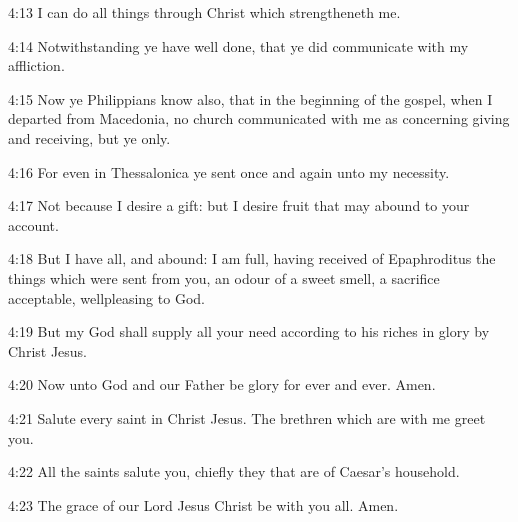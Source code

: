 4:13 I can do all things through Christ which strengtheneth me.

4:14 Notwithstanding ye have well done, that ye did communicate with
my affliction.

4:15 Now ye Philippians know also, that in the beginning of the
gospel, when I departed from Macedonia, no church communicated with me
as concerning giving and receiving, but ye only.

4:16 For even in Thessalonica ye sent once and again unto my
necessity.

4:17 Not because I desire a gift: but I desire fruit that may abound
to your account.

4:18 But I have all, and abound: I am full, having received of
Epaphroditus the things which were sent from you, an odour of a sweet
smell, a sacrifice acceptable, wellpleasing to God.

4:19 But my God shall supply all your need according to his riches in
glory by Christ Jesus.

4:20 Now unto God and our Father be glory for ever and ever. Amen.

4:21 Salute every saint in Christ Jesus. The brethren which are with
me greet you.

4:22 All the saints salute you, chiefly they that are of Caesar's
household.

4:23 The grace of our Lord Jesus Christ be with you all. Amen.


